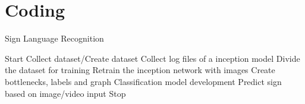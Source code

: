 \chapter{Coding}

\begin{algorithm}
\begin{algorithmic}[1]
\caption{Sign Language Recognition }
\State Start
\State Collect dataset/Create dataset
\State Collect log files of a inception model
\State Divide the dataset for training
\State Retrain the inception network with images
\State Create bottlenecks, labels and graph
\State Classification model development
\State Predict sign based on image/video input
\State Stop
\end{algorithmic}
\end{algorithm}


